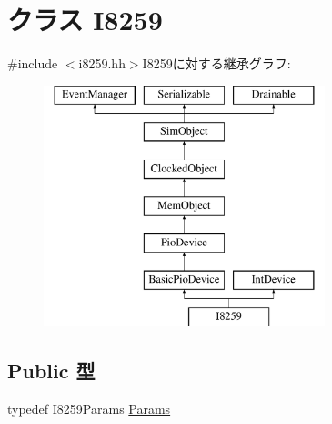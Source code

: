 \hypertarget{classX86ISA_1_1I8259}{
\section{クラス I8259}
\label{classX86ISA_1_1I8259}
}


{\ttfamily \#include $<$i8259.hh$>$}I8259に対する継承グラフ:\begin{figure}[H]
\begin{center}
\leavevmode
\includegraphics[height=7cm]{classX86ISA_1_1I8259}
\end{center}
\end{figure}
\subsection*{Public 型}
\begin{DoxyCompactItemize}
\item 
typedef I8259Params \hyperlink{classX86ISA_1_1I8259_a370f3ee3a425cd3262c46d09b80327fe}{Params}
\end{DoxyCompactItemize}
